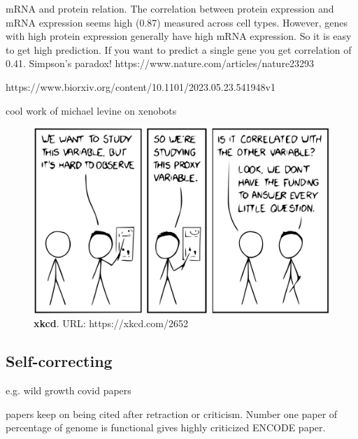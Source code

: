 mRNA and protein relation.
The correlation between protein expression and mRNA expression seems high (0.87) measured across cell types. However, genes with high protein expression generally have high mRNA expression. So it is easy to get high prediction. If you want to predict a single gene you get correlation of 0.41. Simpson's paradox! 
https://www.nature.com/articles/nature23293

https://www.biorxiv.org/content/10.1101/2023.05.23.541948v1

cool work of michael levine on xenobots


\begin{figure}[H]
    \includegraphics[width=\linewidth]{ch.discussion/imgs/xkcd.png}
    \caption{\textbf{xkcd}. URL: https://xkcd.com/2652}
    \label{fig:xkcd}
\end{figure}



\subsection{Self-correcting}

e.g. wild growth covid papers

papers keep on being cited after retraction or criticism. Number one paper of percentage of genome is functional gives highly criticized ENCODE paper.

